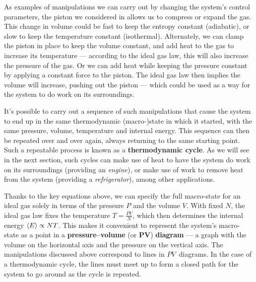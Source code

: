 As examples of manipulations we can carry out by changing the system's control parameters, the piston we considered in  allows us to compress or expand the gas.
This change in volume could be fast to keep the entropy constant (adiabatic), or slow to keep the temperature constant (isothermal).
Alternately, we can clamp the piston in place to keep the volume constant, and add heat to the gas to increase its temperature --- according to the ideal gas law, this will also increase the pressure of the gas.
Or we can add heat while keeping the pressure constant by applying a constant force to the piston.
The ideal gas law then implies the volume will increase, pushing out the piston --- which could be used as a way for the system to do work on its surroundings.

It's possible to carry out a sequence of such manipulations that cause the system to end up in the same thermodynamic (macro-)state in which it started, with the same pressure, volume, temperature and internal energy. %
This sequence can then be repeated over and over again, always returning to the same starting point.
Such a repeatable process is known as a \textbf{thermodynamic cycle}.
As we will see in the next section, such cycles can make use of heat to have the system do work on its surroundings (providing an \textit{engine}), or make use of work to remove heat from the system (providing a \textit{refrigerator}), among other applications.

Thanks to the key equations above, we can specify the full macro-state for an ideal gas solely in terms of the pressure $P$ and the volume $V$.
With fixed $N$, the ideal gas law fixes the temperature $T = \frac{PV}{N}$, which then determines the internal energy $\left\langle E \right\rangle \propto NT$.
This makes it convenient to represent the system's macro-state as a point in a \textbf{pressure--volume} (or $\mathbf{PV}$) \textbf{diagram} --- a graph with the volume on the horizontal axis and the pressure on the vertical axis.
The manipulations discussed above correspond to lines in $PV$~diagrams.
In the case of a thermodynamic cycle, the lines must meet up to form a closed path for the system to go around as the cycle is repeated.

